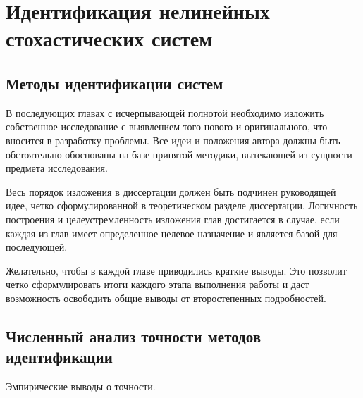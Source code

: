 \chapter[Идентификация нелинейных стохастических систем]{%
  Идентификация нелинейных \hspace{2cm}
  стохастических систем
}

\section{Методы идентификации систем}

В последующих главах с исчерпывающей полнотой  необходимо изложить собственное исследование с выявлением того нового и оригинального, что вносится в разработку проблемы. Все идеи и положения автора должны быть обстоятельно обоснованы на базе принятой методики, вытекающей из сущности предмета исследования.

Весь порядок изложения в диссертации должен быть подчинен  руководящей идее, четко сформулированной в теоретическом разделе диссертации. Логичность построения и целеустремленность изложения  глав достигается в случае, если каждая из глав имеет определенное целевое назначение и является базой для последующей.

Желательно, чтобы в каждой главе приводились краткие выводы. Это позволит четко сформулировать итоги каждого этапа выполнения работы и даст возможность освободить общие выводы от второстепенных подробностей.

\section{Численный анализ точности методов идентификации}

Эмпирические выводы о точности.